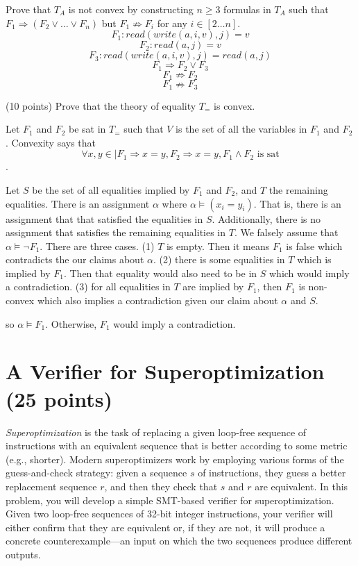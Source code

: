 \documentclass{handout}
\begin{document}
\begin{questions}
Prove that $T_A$ is not convex by constructing $n\geq 3$ formulas in $T_A$ such
that $F_1 \Rightarrow (F_2 \vee\ldots \vee F_n)$ but $F_1 \not\Rightarrow F_i$
for any $i \in [2\ldots n]$.
\[F_1 : read(write(a, i, v), j) = v\]
\[F_2 : read(a, j) = v\]
\[F_3 : read(write(a,i,v), j) = read(a, j)\]
\[ F_1 \Rightarrow F_2 \vee F_3\]
\[ F_1 \nRightarrow F_2 \]
\[ F_1 \nRightarrow F_3 \]


\item (10 points) \label{prob:smt:last} Prove that the theory of equality $T_=$
is convex.

Let $F_1$ and $F_2$ be sat in $T_{=}$ such that $V$ is the set of all the variables in $F_1$ and $F_2$. Convexity says that \[ \forall x, y \in | F_1 \Rightarrow x=y, F_2 \Rightarrow x=y,  F_1 \wedge F_2 \text{ is sat} \].

Let $S$ be the set of all equalities implied by $F_1$ and $F_2$, and $T$ the remaining equalities. There is an assignment $\alpha$ where $\alpha \models (x_i=y_i)$. That is, there is an assignment that that satisfied the equalities in $S$. Additionally, there is no assignment that satisfies the remaining equalities in $T$. We falsely assume that $\alpha \models \neg F_1$. There are three cases.
(1) $T$ is empty. Then it means $F_1$ is false which contradicts the our claims about $\alpha$.
(2) there is some equalities in $T$ which is implied by $F_1$. Then that equality would also need to be in $S$ which would imply a contradiction.
(3) for all equalities in $T$ are implied by $F_1$, then $F_1$ is non-convex which also implies a contradiction given our claim about $\alpha$ and $S$.

so $\alpha \models F_1$. Otherwise, $F_1$ would imply a contradiction. 



\end{questions}



\section{A Verifier for Superoptimization (25 points)}

\emph{Superoptimization} is the task of replacing a given loop-free sequence of
instructions with an equivalent sequence that is better according to some metric
(e.g., shorter).  Modern superoptimizers work by employing various forms of the
guess-and-check strategy:  given a sequence $s$ of instructions, they guess a
better replacement sequence $r$, and then they check that $s$ and $r$ are
equivalent.  In this problem, you will develop a simple SMT-based verifier for
superoptimization.  Given two loop-free sequences of 32-bit integer
instructions, your verifier will either confirm that they are equivalent or, if
they are not, it will produce a concrete counterexample---an input on which the
two sequences produce different outputs.
\end{document}
